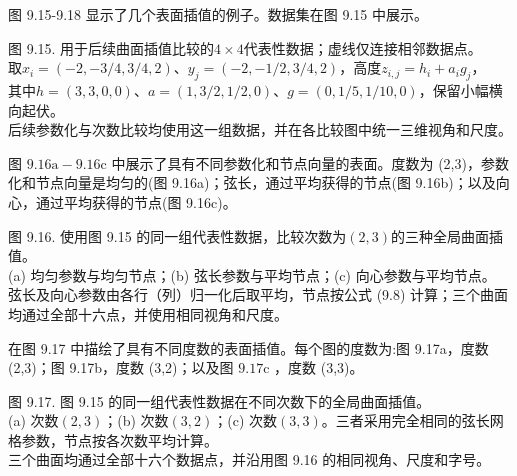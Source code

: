 \documentclass[../main.tex]{subfiles}
\begin{document}
图 9.15-9.18 显示了几个表面插值的例子。数据集在图 9.15 中展示。

\begin{center}
\begin{minipage}{29cm}
\vspace*{.6\baselineskip}
\centering
{}
\par\smallskip
图 9.15. 用于后续曲面插值比较的$4\times4$代表性数据；虚线仅连接相邻数据点。\\
取$x_i=(-2,-3/4,3/4,2)$、$y_j=(-2,-1/2,3/4,2)$，高度$z_{i,j}=h_i+a_i g_j$，\\
其中$h=(3,3,0,0)$、$a=(1,3/2,1/2,0)$、$g=(0,1/5,1/10,0)$，保留小幅横向起伏。\\
后续参数化与次数比较均使用这一组数据，并在各比较图中统一三维视角和尺度。
\end{minipage}
\end{center}

图 \({9.16}\mathrm{a} - {9.16}\mathrm{c}\) 中展示了具有不同参数化和节点向量的表面。度数为 (2,3)，参数化和节点向量是均匀的(图 9.16a)；弦长，通过平均获得的节点(图 9.16b)；以及向心，通过平均获得的节点(图 9.16c)。

\begin{center}
\begin{minipage}{29cm}
\vspace*{.6\baselineskip}
\centering
{}
\par\smallskip
{}
\par\smallskip
图 9.16. 使用图 9.15 的同一组代表性数据，比较次数为$(2,3)$的三种全局曲面插值。\\
(a) 均匀参数与均匀节点；(b) 弦长参数与平均节点；(c) 向心参数与平均节点。\\
弦长及向心参数由各行（列）归一化后取平均，节点按公式 (9.8) 计算；三个曲面均通过全部十六点，并使用相同视角和尺度。
\end{minipage}
\end{center}

在图 9.17 中描绘了具有不同度数的表面插值。每个图的度数为:图 9.17a，度数 (2,3)；图 9.17b，度数 (3,2)；以及图 \({9.17}\mathrm{c}\) ，度数 (3,3)。

\begin{center}
\begin{minipage}{29cm}
\vspace*{.6\baselineskip}
\centering
{}
\par\smallskip
{}
\par\smallskip
图 9.17. 图 9.15 的同一组代表性数据在不同次数下的全局曲面插值。\\
(a) 次数$(2,3)$；(b) 次数$(3,2)$；(c) 次数$(3,3)$。三者采用完全相同的弦长网格参数，节点按各次数平均计算。\\
三个曲面均通过全部十六个数据点，并沿用图 9.16 的相同视角、尺度和字号。
\end{minipage}
\end{center}
\end{document}
